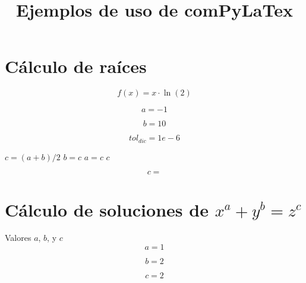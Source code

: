 \documentclass{article}
\title{Ejemplos de uso de comPyLaTex}
\author{}
\date{}
\begin{document}
\maketitle


\section{Cálculo de raíces}

\begin{equation}
f(x) = x \cdot \ln(2)
\label{eq:calc:f}
\end{equation}

\begin{equation}
a = -1
\label{eq:calc:a}
\end{equation}

\begin{equation}
b = 10
\label{eq:calc:b}
\end{equation}

\begin{equation}
    tol_{dic} = 1e-6
    \label{eq:calc:toldic}
\end{equation}

\begin{algorithm}
\caption{Método de dicotomía}
\label{alg:calc:dicotomia}
\begin{algorithmic}
    \STATE $c = (a + b)/2$
        \STATE $b = c$
    \ELSE
        \STATE $a = c$
    \ENDIF
\ENDWHILE
\RETURN $c$
\end{algorithmic}
\end{algorithm}

\begin{equation}
    c = 
    \label{eq:res:c}
\end{equation}

\section{Cálculo de soluciones de $x^a + y^b = z^c$}

Valores $a$, $b$, y $c$
\begin{equation}
a = 1
\label{eq:calc:a}
\end{equation}

\begin{equation}
b = 2
\label{eq:calc:b}
\end{equation}

\begin{equation}
c = 2
\label{eq:calc:c}
\end{equation}
\end{document}
